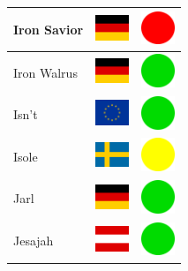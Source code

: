 \documentclass[12pt, a4paper, twoside]{report}
\begin{document}
\begin{center}
\begin{longtable}{|p{5cm}|p{2cm}|p{2cm}|}
 Iron Savior                                                & \includegraphics[width=1cm]{../img/flags/de} &   \includegraphics[width=1cm]{../likes/n} \\ \hline
 Iron Walrus                                                & \includegraphics[width=1cm]{../img/flags/de} &   \includegraphics[width=1cm]{../likes/y} \\ \hline
 Isn't                                                      & \includegraphics[width=1cm]{../img/flags/eu} &   \includegraphics[width=1cm]{../likes/y} \\ \hline
 Isole                                                      & \includegraphics[width=1cm]{../img/flags/se} &   \includegraphics[width=1cm]{../likes/m} \\ \hline
 Jarl                                                       & \includegraphics[width=1cm]{../img/flags/de} &   \includegraphics[width=1cm]{../likes/y} \\ \hline
 Jesajah                                                    & \includegraphics[width=1cm]{../img/flags/at} &   \includegraphics[width=1cm]{../likes/y} \\ \hline

\end{longtable}
\end{center}
\end{document}
